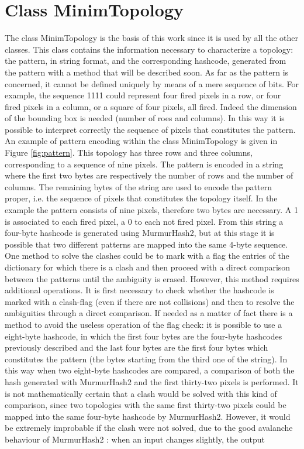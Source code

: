 \section{Class MinimTopology}
The class MinimTopology is the basis of this work since it is used by all the other classes. This class contains the information necessary to characterize a topology: the pattern, in string format, and the corresponding hashcode, generated from the pattern with a method that will be described soon. As far as the pattern is concerned, it cannot be defined uniquely by means of a mere sequence of bits. For example, the sequence 1111 could represent four fired pixels in a row, or four fired pixels in a column, or a square of four pixels, all fired. Indeed the dimension of the bounding box is needed (number of roes and columns). In this way it is possible to interpret correctly the sequence of pixels that constitutes the pattern. An example of pattern encoding within the class MinimTopology is given in Figure \ref{fig:pattern}. This topology has three rows and three columns, corresponding to a sequence of nine pixels. The pattern is encoded in a string where the first two bytes are respectively the number of rows and the number of columns. The remaining bytes of the string are used to encode the pattern proper, i.e. the sequence of pixels that constitutes the topology itself. In the example the pattern consists of nine pixels, therefore two bytes are necessary. A 1 is associated to each fired pixel, a 0 to each not fired pixel. From this string a four-byte hashcode is generated using MurmurHash2, but at this stage it is possible that two different patterns are mapped into the same 4-byte sequence. One method to solve the clashes could be to mark with a flag the entries of the dictionary for which there is a clash and then proceed with a direct comparison between the patterns until the ambiguity is erased. However, this method requires additional operations. It is first necessary to check whether the hashcode is marked with a clash-flag (even if there are not collisions) and then to resolve the ambiguities through a direct comparison. If needed as a matter of fact there is a method to avoid the useless operation of the flag check: it is possible to use a eight-byte hashcode, in which the first four bytes are the four-byte hashcodes previously described and the last four bytes are the first four bytes which constitutes the pattern (the bytes starting from the third one of the string). In this way when two eight-byte hashcodes are compared, a comparison of both the hash generated with MurmurHash2 and the first thirty-two pixels is performed. It is not mathematically certain that a clash would be solved with this kind of comparison, since two topologies with the same first thirty-two pixels could be mapped into the same four-byte hashcode by MurmurHash2. However, it would be extremely improbable if the clash were not solved, due to the good avalanche behaviour of MurmurHash2 \cite{hash}: when an input changes slightly, the output 